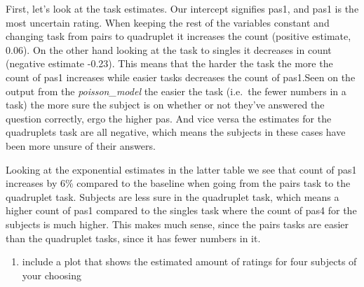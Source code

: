 \documentclass[
]{article}
\newenvironment{Shaded}{\begin{snugshade}}{\end{snugshade}}
\newcommand{\AttributeTok}[1]{\textcolor[rgb]{0.77,0.63,0.00}{#1}}
\newcommand{\FunctionTok}[1]{\textcolor[rgb]{0.00,0.00,0.00}{#1}}
\newcommand{\NormalTok}[1]{#1}
\newcommand{\OtherTok}[1]{\textcolor[rgb]{0.56,0.35,0.01}{#1}}
\newcommand{\SpecialCharTok}[1]{\textcolor[rgb]{0.00,0.00,0.00}{#1}}
\newcommand{\StringTok}[1]{\textcolor[rgb]{0.31,0.60,0.02}{#1}}
\providecommand{\tightlist}{%
  \setlength{\itemsep}{0pt}\setlength{\parskip}{0pt}}
\begin{document}
First, let's look at the task estimates. Our intercept signifies pas1,
and pas1 is the most uncertain rating. When keeping the rest of the
variables constant and changing task from pairs to quadruplet it
increases the count (positive estimate, 0.06). On the other hand looking
at the task to singles it decreases in count (negative estimate -0.23).
This means that the harder the task the more the count of pas1 increases
while easier tasks decreases the count of pas1.Seen on the output from
the \emph{poisson\_model} the easier the task (i.e.~the fewer numbers in
a task) the more sure the subject is on whether or not they've answered
the question correctly, ergo the higher pas. And vice versa the
estimates for the quadruplets task are all negative, which means the
subjects in these cases have been more unsure of their answers.

Looking at the exponential estimates in the latter table we see that
count of pas1 increases by 6\% compared to the baseline when going from
the pairs task to the quadruplet task. Subjects are less sure in the
quadruplet task, which means a higher count of pas1 compared to the
singles task where the count of pas4 for the subjects is much higher.
This makes much sense, since the pairs tasks are easier than the
quadruplet tasks, since it has fewer numbers in it.

\begin{enumerate}
\def\labelenumi{\roman{enumi}.}
\setcounter{enumi}{6}
\tightlist
\item
  include a plot that shows the estimated amount of ratings for four
  subjects of your choosing
\end{enumerate}

\begin{Shaded}
\end{Shaded}
\end{document}
